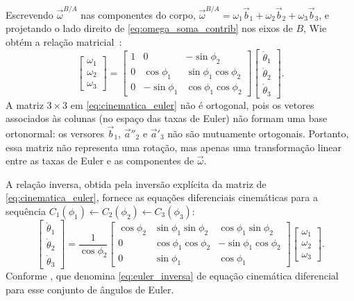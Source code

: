 Escrevendo $\vec{\omega}^{B/A}$ nas componentes do corpo,
$\vec{\omega}^{B/A} = \omega_1 \vec{b}_1 + \omega_2 \vec{b}_2 + \omega_3 \vec{b}_3$,
e projetando o lado direito de \eqref{eq:omega_soma_contrib} nos eixos de $B$,
Wie obtém a relação matricial~\cite{wie2008space}:
\begin{equation}
\begin{bmatrix}
\omega_1 \\[2pt] \omega_2 \\[2pt] \omega_3
\end{bmatrix}
=
\begin{bmatrix}
1 & 0 & -\sin\phi_2 \\
0 & \cos\phi_1 & \sin\phi_1 \cos\phi_2 \\
0 & -\sin\phi_1 & \cos\phi_1 \cos\phi_2
\end{bmatrix}
\begin{bmatrix}
\dot{\theta}_1 \\[2pt] \dot{\theta}_2 \\[2pt] \dot{\theta}_3
\end{bmatrix}.
\label{eq:cinematica_euler}
\end{equation}
A matriz $3\times 3$ em \eqref{eq:cinematica_euler} não é ortogonal,
pois os vetores associados às colunas (no espaço das taxas de Euler) não formam
uma base ortonormal: os versores $\vec{b}_1$, $\vec{a}''_2$ e $\vec{a}'_3$ não
são mutuamente ortogonais. Portanto, essa matriz não representa uma rotação,
mas apenas uma transformação linear entre as taxas de Euler e as componentes de
$\vec{\omega}$.

A relação inversa,
obtida pela inversão explícita da matriz de \eqref{eq:cinematica_euler},
fornece as equações diferenciais cinemáticas para a sequência
$C_1(\phi_1) \leftarrow C_2(\phi_2) \leftarrow C_3(\phi_3)$:
\begin{equation}
\begin{bmatrix}
\dot{\theta}_1 \\[2pt] \dot{\theta}_2 \\[2pt] \dot{\theta}_3
\end{bmatrix}
=
\frac{1}{\cos\phi_2}
\begin{bmatrix}
\cos\phi_2 & \sin\phi_1 \sin\phi_2 & \cos\phi_1 \sin\phi_2 \\
0 & \cos\phi_1 \cos\phi_2 & -\sin\phi_1 \cos\phi_2 \\
0 & \sin\phi_1 & \cos\phi_1
\end{bmatrix}
\begin{bmatrix}
\omega_1 \\[2pt] \omega_2 \\[2pt] \omega_3
\end{bmatrix}.
\label{eq:euler_inversa}
\end{equation}
Conforme \cite{wie2008space}, que denomina \eqref{eq:euler_inversa} de equação cinemática diferencial para esse conjunto de ângulos de Euler.

